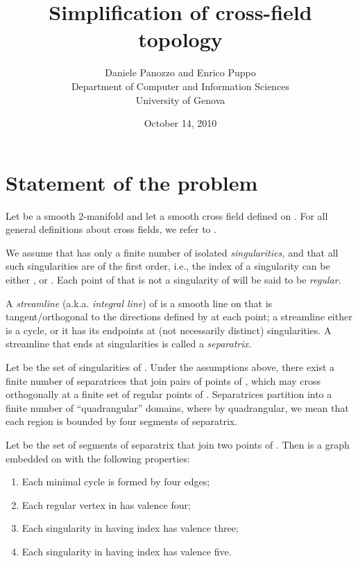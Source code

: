 \documentclass[11pt,a4paper]{article}
\begin{document}
\title{Simplification of cross-field topology}

\author
     {Daniele Panozzo and Enrico Puppo\\
        Department of Computer and Information Sciences\\
      University of Genova
   }

\date{October 14, 2010}

\maketitle










\section{Statement of the problem}
\label{sec:statement}

Let  be a smooth 2-manifold and let  a smooth cross field defined on .
For all general definitions about cross fields, we refer to \cite{RayValLiLev08}.

We assume that  has only a finite number of isolated {\em singularities,} and that all such singularities are of the first order, i.e., the index of a singularity can be either , or .
Each point of  that is not a singularity of  will be said to be \emph{regular.}

A {\em streamline} (a.k.a. {\em integral line}) of  is a smooth line on  that is tangent/orthogonal to the directions defined by  at each point;
a streamline either is a cycle, or it has its endpoints at (not necessarily distinct) singularities.
A streamline that ends at singularities is called a \emph{separatrix.}

Let  be the set of singularities of .  
Under the assumptions above, there exist a finite number of separatrices that join pairs of points of , which may cross orthogonally at a finite set  of regular points of .
Separatrices partition  into a finite number of ``quadrangular'' domains, where  by quadrangular, we mean that each region is bounded by four segments of separatrix. 

Let  be the set of segments of separatrix that join two points of . 
Then  is a graph embedded on  with the following properties:
\begin{enumerate}
\item Each minimal cycle is formed by four edges;
\item Each regular vertex in  has valence four;
\item Each singularity in  having index  has valence three;
\item Each singularity in  having index  has valence five.
\end{enumerate}
\end{document}
